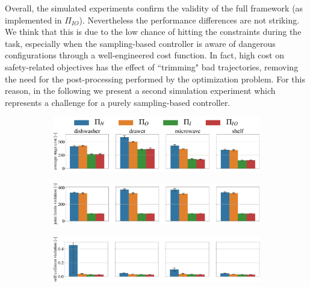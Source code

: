 Overall, the simulated experiments confirm the validity of the full framework (as implemented in $\Pi_{IO}$). Nevertheless the performance differences are not striking. We think that this is due to the low chance of hitting the constraints during the task, especially when the sampling-based controller is aware of dangerous configurations through a well-engineered cost function. In fact, high cost on safety-related objectives has the effect of ``trimming" bad trajectories, removing the need for the post-processing performed by the optimization problem. For this reason, in the following we present a second simulation experiment which represents a challenge for a purely sampling-based controller. 

\begin{figure}[t]
\centering
\hspace*{-0.2cm}
\vspace*{0.15cm}
\begin{subfigure}{1\columnwidth}
    \includegraphics[width=\linewidth]{figures/methods_comparison/average_stage_cost.pdf}
\end{subfigure}%
\hfill
\hspace*{-0.2cm}
\vspace*{0.1cm}
\begin{subfigure}{\columnwidth}
    \includegraphics[width=\linewidth]{figures/methods_comparison/joint_limits.pdf}
\end{subfigure}%
\hfill
\hspace*{-0.2cm}
\vspace*{0.1cm}
\begin{subfigure}{\columnwidth}
    \includegraphics[width=\linewidth]{figures/methods_comparison/self_collision.pdf}

\end{subfigure}
\end{figure}
